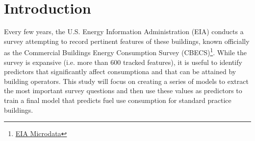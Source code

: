 \section{Introduction}
\label{sec:introduction}

Every few years, the U.S. Energy Information Administration (EIA) conducts a survey attempting to record pertinent features of these buildings, known officially as the Commercial Buildings Energy Consumption Survey (CBECS)\footnote{\href{https://www.eia.gov/consumption/commercial/data/2012/index.php?view=microdata}{EIA Microdata}}.  While the survey is expansive (i.e. more than 600 tracked features), it is useful to identify predictors that significantly affect consumptiona and that can be attained by building operators.  This study will focus on creating a series of models to extract the most important survey questions and then use these values as predictors to train a final model that predicts fuel use consumption for standard practice buildings.
